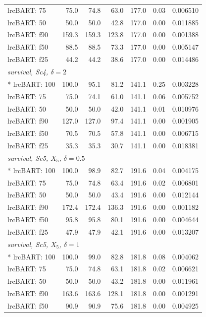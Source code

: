 \begin{longtable}{lrrrrrr}
lrcBART: 75 & 75.0 & 74.8 & 63.0 & 177.0 & 0.03 & 0.006510 \\
lrcBART: 50 & 50.0 & 50.0 & 42.8 & 177.0 & 0.00 & 0.011885 \\
lrcBART: f90 & 159.3 & 159.3 & 123.8 & 177.0 & 0.00 & 0.001388 \\
lrcBART: f50 & 88.5 & 88.5 & 73.3 & 177.0 & 0.00 & 0.005147 \\
lrcBART: f25 & 44.2 & 44.2 & 38.6 & 177.0 & 0.00 & 0.014486 \\
\multicolumn{7}{l}{\strut\textit{survival, Sc4, $\delta=2$}}\\*
lrcBART: 100 & 100.0 & 95.1 & 81.2 & 141.1 & 0.25 & 0.003228 \\
lrcBART: 75 & 75.0 & 74.1 & 61.0 & 141.1 & 0.06 & 0.005752 \\
lrcBART: 50 & 50.0 & 50.0 & 42.0 & 141.1 & 0.01 & 0.010976 \\
lrcBART: f90 & 127.0 & 127.0 & 97.4 & 141.1 & 0.00 & 0.001905 \\
lrcBART: f50 & 70.5 & 70.5 & 57.8 & 141.1 & 0.00 & 0.006715 \\
lrcBART: f25 & 35.3 & 35.3 & 30.7 & 141.1 & 0.00 & 0.018381 \\
\multicolumn{7}{l}{\strut\textit{survival, Sc5, $X_5$, $\delta=0.5$}}\\*
lrcBART: 100 & 100.0 & 98.9 & 82.7 & 191.6 & 0.04 & 0.004175 \\
lrcBART: 75 & 75.0 & 74.8 & 63.4 & 191.6 & 0.02 & 0.006801 \\
lrcBART: 50 & 50.0 & 50.0 & 43.4 & 191.6 & 0.00 & 0.012144 \\
lrcBART: f90 & 172.4 & 172.4 & 136.3 & 191.6 & 0.00 & 0.001182 \\
lrcBART: f50 & 95.8 & 95.8 & 80.1 & 191.6 & 0.00 & 0.004644 \\
lrcBART: f25 & 47.9 & 47.9 & 42.1 & 191.6 & 0.00 & 0.013207 \\
\multicolumn{7}{l}{\strut\textit{survival, Sc5, $X_5$, $\delta=1$}}\\*
lrcBART: 100 & 100.0 & 99.0 & 82.8 & 181.8 & 0.08 & 0.004062 \\
lrcBART: 75 & 75.0 & 74.8 & 63.1 & 181.8 & 0.02 & 0.006621 \\
lrcBART: 50 & 50.0 & 50.0 & 43.2 & 181.8 & 0.00 & 0.011961 \\
lrcBART: f90 & 163.6 & 163.6 & 128.1 & 181.8 & 0.00 & 0.001291 \\
lrcBART: f50 & 90.9 & 90.9 & 75.6 & 181.8 & 0.00 & 0.004925 \\

\end{longtable}
